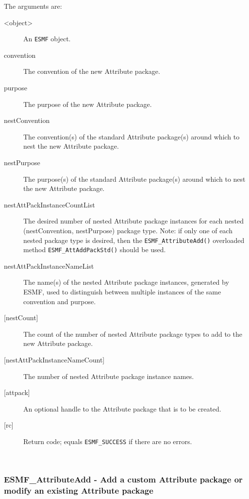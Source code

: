    The arguments are:
   \begin{description}
   \item [<object>]
   An {\tt ESMF} object.
   \item [convention]
   The convention of the new Attribute package.
   \item [purpose]
   The purpose of the new Attribute package.
   \item [nestConvention]
   The convention(s) of the standard Attribute package(s) around
   which to nest the new Attribute package.
   \item [nestPurpose]
   The purpose(s) of the standard Attribute package(s) around
   which to nest the new Attribute package.
   \item [nestAttPackInstanceCountList]
   The desired number of nested Attribute package instances for each
   nested (nestConvention, nestPurpose) package type. Note: if only one
   of each nested package type is desired, then the
   {\tt ESMF\_AttributeAdd()} overloaded method
   {\tt ESMF\_AttAddPackStd()} should be used.
   \item [nestAttPackInstanceNameList]
   The name(s) of the nested Attribute package instances, generated
   by ESMF, used to distinguish between multiple instances of the
   same convention and purpose.
   \item [{[nestCount]}]
   The count of the number of nested Attribute package types to add to
   the new Attribute package.
   \item [{[nestAttPackInstanceNameCount]}]
   The number of nested Attribute package instance names.
   \item [{[attpack]}]
   An optional handle to the Attribute package that is to be created.
   \item [{[rc]}]
   Return code; equals {\tt ESMF\_SUCCESS} if there are no errors.
   \end{description}
  
   
 
\mbox{}\hrulefill\ 
 
\subsubsection [ESMF\_AttributeAdd] {ESMF\_AttributeAdd - Add a custom Attribute package or modify an existing Attribute package}


